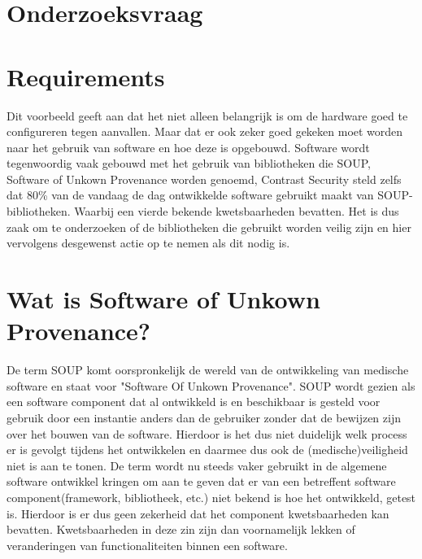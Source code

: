 \section{Onderzoeksvraag}

\section{Requirements}


Dit voorbeeld geeft aan dat het niet alleen belangrijk is om de hardware goed te configureren tegen aanvallen.
Maar dat er ook zeker goed gekeken moet worden naar het gebruik van software en hoe deze is opgebouwd.
Software wordt tegenwoordig vaak gebouwd met het gebruik van bibliotheken die SOUP, Software of Unkown Provenance worden genoemd, Contrast Security steld zelfs dat 80\% van de vandaag de dag ontwikkelde software gebruikt maakt van SOUP-bibliotheken.
Waarbij een vierde bekende kwetsbaarheden bevatten.
Het is dus zaak om te onderzoeken of de bibliotheken die gebruikt worden veilig zijn en hier vervolgens desgewenst actie op te nemen als dit nodig is.

\section{Wat is Software of Unkown Provenance?}\label{sec:wat-is-soup?}
De term SOUP komt oorspronkelijk de wereld van de ontwikkeling van medische software en staat voor "Software Of Unkown Provenance".
SOUP wordt gezien als een software component dat al ontwikkeld is en beschikbaar is gesteld voor gebruik door een instantie anders dan de gebruiker zonder dat de bewijzen zijn over het bouwen van de software.
Hierdoor is het dus niet duidelijk welk process er is gevolgt tijdens het ontwikkelen en daarmee dus ook de (medische)veiligheid niet is aan te tonen.
De term wordt nu steeds vaker gebruikt in de algemene software ontwikkel kringen om aan te geven dat er van een betreffent software component(framework, bibliotheek, etc.) niet bekend is hoe het ontwikkeld, getest is.
Hierdoor is er dus geen zekerheid dat het component kwetsbaarheden kan bevatten.
Kwetsbaarheden in deze zin zijn dan voornamelijk lekken of veranderingen van functionaliteiten binnen een software.


